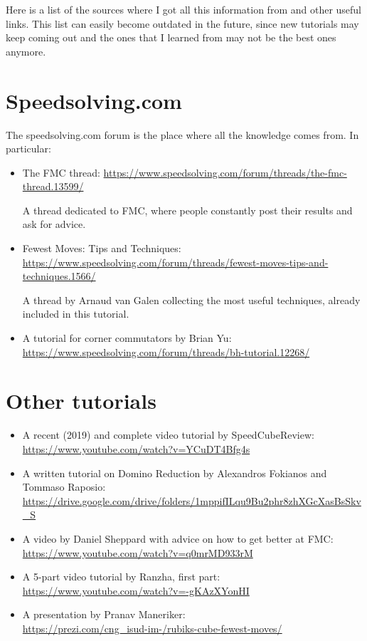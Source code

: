 \documentclass[11pt,a4paper]{book}
\begin{document}
Here is a list of the sources where I got all this information from and other useful links. This list can easily become outdated in the future, since new tutorials may keep coming out and the ones that I learned from may not be the best ones anymore.

\section*{Speedsolving.com}

The speedsolving.com forum is the place where all the knowledge comes from. In particular:

\begin{itemize}
\item The FMC thread: \url{https://www.speedsolving.com/forum/threads/the-fmc-thread.13599/}

A thread dedicated to FMC, where people constantly post their results and ask for advice.
\item Fewest Moves: Tips and Techniques: \url{https://www.speedsolving.com/forum/threads/fewest-moves-tips-and-techniques.1566/}

A thread by Arnaud van Galen collecting the most useful techniques, already included in this tutorial.

\item A tutorial for corner commutators by Brian Yu: \url{https://www.speedsolving.com/forum/threads/bh-tutorial.12268/}
\end{itemize}

\section*{Other tutorials}

\begin{itemize}
\item A recent (2019) and complete video tutorial by SpeedCubeReview: \url{https://www.youtube.com/watch?v=YCuDT4Bfg4s}
\item A written tutorial on Domino Reduction by Alexandros Fokianos and Tommaso Raposio: \url{https://drive.google.com/drive/folders/1mppifILqu9Bu2phr8zhXGcXasBsSkv_S}
\item A video by Daniel Sheppard with advice on how to get better at FMC: \url{https://www.youtube.com/watch?v=q0mrMD933rM}
\item A 5-part video tutorial by Ranzha, first part:\\ \url{https://www.youtube.com/watch?v=-gKAzXYonHI}
\item A presentation by Pranav Maneriker:\\ \url{https://prezi.com/cng_isud-im-/rubiks-cube-fewest-moves/}
\end{itemize}
\end{document}
